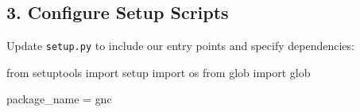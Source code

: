 \documentclass[
  letterpaper,
  DIV=11,
  numbers=noendperiod]{scrreprt}
\newenvironment{Shaded}{\begin{snugshade}}{\end{snugshade}}
\newcommand{\ImportTok}[1]{\textcolor[rgb]{0.00,0.46,0.62}{#1}}
\newcommand{\NormalTok}[1]{\textcolor[rgb]{0.00,0.23,0.31}{#1}}
\newcommand{\OperatorTok}[1]{\textcolor[rgb]{0.37,0.37,0.37}{#1}}
\newcommand{\StringTok}[1]{\textcolor[rgb]{0.13,0.47,0.30}{#1}}
\begin{document}
\subsection*{3. Configure Setup Scripts}\label{configure-setup-scripts}

Update \texttt{setup.py} to include our entry points and specify
dependencies:

\begin{Shaded}
\begin{Highlighting}[]
\ImportTok{from}\NormalTok{ setuptools }\ImportTok{import}\NormalTok{ setup}
\ImportTok{import}\NormalTok{ os}
\ImportTok{from}\NormalTok{ glob }\ImportTok{import}\NormalTok{ glob}

\NormalTok{package\_name }\OperatorTok{=} \StringTok{\textquotesingle{}gnc\textquotesingle{}}


\end{Highlighting}
\end{Shaded}
\end{document}
